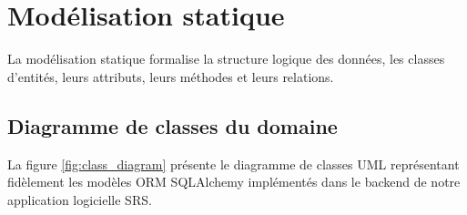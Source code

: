 \section{Modélisation statique}

La modélisation statique formalise la structure logique des données, les classes d'entités, leurs attributs, leurs méthodes et leurs relations.

\subsection{Diagramme de classes du domaine}

La figure \ref{fig:class_diagram} présente le diagramme de classes UML représentant fidèlement les modèles ORM SQLAlchemy implémentés dans le backend de notre application logicielle SRS.

